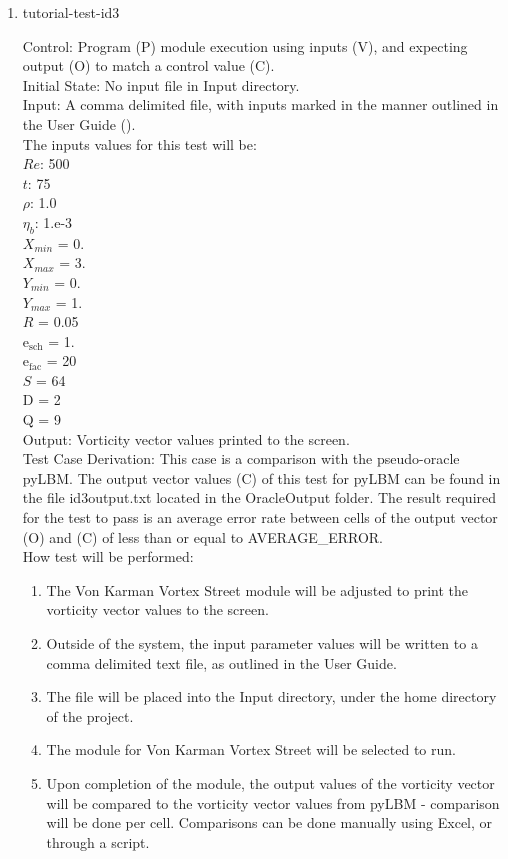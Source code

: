 \documentclass[12pt, titlepage]{article}
\begin{document}
\begin{enumerate}

\item{tutorial-test-id3\\}

Control: Program (P) module execution using inputs (V), and expecting output (O) to match a control value (C).\\
					
Initial State: No input file in Input directory.\\
					
Input: A comma delimited file, with inputs marked in the manner outlined in the User Guide (\citet{LBM_UserGuide_PM}).\\The inputs values for this test will be:\\
$Re$: 500\\
$t$: 75\\
$\rho$: 1.0\\
$\eta_b$: 1.e-3\\
$X_{min}$ = 0.\\
$X_{max}$ = 3.\\
$Y_{min}$ = 0.\\
$Y_{max}$ = 1.\\
$R$ = 0.05\\
$\mathrm{e_{sch}}$ = 1.\\
$\mathrm{e_{fac}}$ = 20\\
$S$ = 64\\
$\mathrm{D}$ = 2\\
$\mathrm{Q}$ = 9\\

		
Output: Vorticity vector values printed to the screen. \\

Test Case Derivation: This case is a comparison with the pseudo-oracle pyLBM. The output vector values (C) of this test for pyLBM can be found in the file id3output.txt located in the OracleOutput folder. The result required for the test to pass is an average error rate between cells of the output vector (O) and (C) of less than or equal to AVERAGE\_ERROR.\\


How test will be performed: 

\begin{enumerate}
\item The Von Karman Vortex Street module will be adjusted to print the vorticity vector values to the screen.
\item Outside of the system, the input parameter values will be written to a comma delimited text file, as outlined in the User Guide.
\item The file will be placed into the Input directory, under the home directory of the project.
\item The module for Von Karman Vortex Street will be selected to run.
\item Upon completion of the module, the output values of the vorticity vector will be compared to the vorticity vector values from pyLBM - comparison will be done per cell. Comparisons can be done manually using Excel, or through a script.\\
\end{enumerate}


\end{enumerate}
\end{document}
